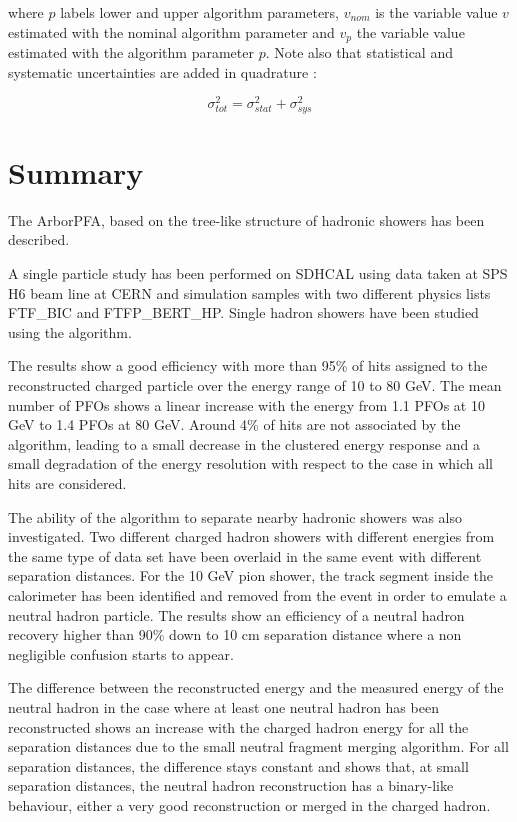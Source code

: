 \documentclass[cits]{JINST}
\begin{document}
where $p$ labels lower and upper algorithm parameters, $v_{nom}$ is the variable value $v$ estimated with the nominal algorithm parameter and $v_{p}$ the variable value estimated with the algorithm parameter $p$. Note also that statistical and systematic uncertainties are added in quadrature :

\begin{equation}
  \sigma_{tot}^2 = \sigma_{stat}^2 + \sigma_{sys}^2
\end{equation}


\newpage
\section{Summary}

The ArborPFA, based on the tree-like structure of hadronic showers has been described. 

A single particle study has been performed on SDHCAL using data taken at SPS H6 beam line at CERN \cite{sdhcal-paper} and simulation samples with two different physics lists FTF\_BIC and FTFP\_BERT\_HP. Single hadron showers have been studied using the algorithm.

The results show a good efficiency with more than 95\% of hits assigned to the reconstructed charged particle over the energy range of 10 to 80 GeV. The mean number of PFOs shows a linear increase with the energy from 1.1 PFOs at 10 GeV to 1.4 PFOs at 80 GeV. Around 4\% of hits are not associated by the algorithm, leading to a small decrease in the clustered energy response and a small degradation of the energy resolution with respect to the case in which all hits are considered.

The ability of the algorithm to separate nearby hadronic showers was also investigated. Two different charged hadron showers with different energies from the same type of data set have been overlaid in the same event with different separation distances. For the 10 GeV pion shower, the track segment inside the calorimeter has been identified and removed from the event in order to emulate a neutral hadron particle. The results show an efficiency of a neutral hadron recovery higher than 90\% down to 10 cm separation distance where a non negligible confusion starts to appear. 

The difference between the reconstructed energy and the measured energy of the neutral hadron in the case where at least one neutral hadron has been reconstructed shows an increase with the charged hadron energy for all the separation distances due to the small neutral fragment merging algorithm. For all separation distances, the difference stays constant and shows that, at small separation distances, the neutral hadron reconstruction has a binary-like behaviour, either a very good reconstruction or merged in the charged hadron.
\end{document}
